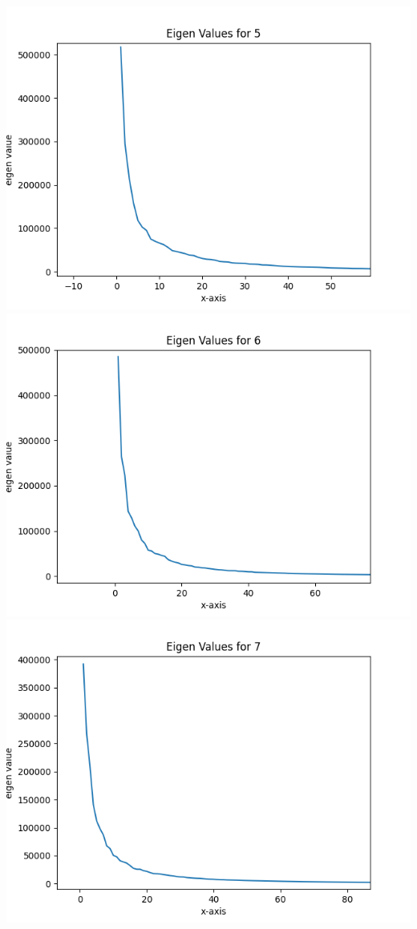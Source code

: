 \documentclass{article}
\begin{document}
    \includegraphics[scale=.5]{../results/q4/eigen_plots/5_eigen_value.png}
    \\
    \includegraphics[scale=.5]{../results/q4/eigen_plots/6_eigen_value.png}
    \includegraphics[scale=.5]{../results/q4/eigen_plots/7_eigen_value.png}
\end{document}
